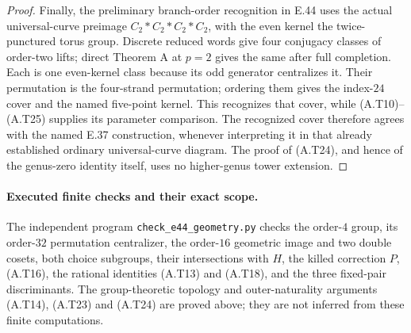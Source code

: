 \begin{proof}
Finally, the preliminary branch-order recognition in E.44
uses the actual universal-curve preimage
$C_2*C_2*C_2*C_2$, with the even kernel the twice-punctured
torus group.  Discrete reduced words give four conjugacy
classes of order-two lifts; direct Theorem A at $p=2$
gives the same after full completion.  Each is one
even-kernel class because its odd generator centralizes
it.  Their permutation is the four-strand permutation;
ordering them gives the index-$24$ cover and the named
five-point kernel.  This recognizes that cover, while
(A.T10)--(A.T25) supplies its parameter comparison.
The recognized cover therefore agrees with the named
E.37 construction, whenever interpreting it in that
already established ordinary universal-curve diagram.
The proof of (A.T24), and hence of the genus-zero
identity itself, uses no higher-genus tower extension.
\end{proof}

\paragraph{Executed finite checks and their exact scope.}
The independent program \texttt{check\_e44\_geometry.py}
checks the order-$4$ group, its order-$32$ permutation
centralizer, the order-$16$ geometric image and two
double cosets, both choice subgroups, their intersections
with $H$, the killed correction $P$, (A.T16), the
rational identities (A.T13) and (A.T18), and the three
fixed-pair discriminants.  The group-theoretic topology
and outer-naturality arguments (A.T14), (A.T23) and
(A.T24) are proved above; they are not inferred from
these finite computations.
